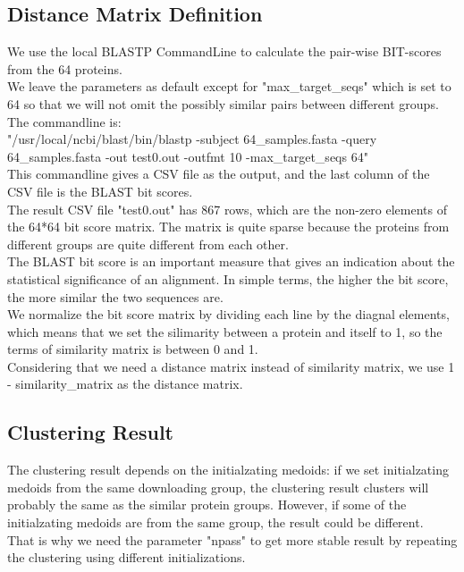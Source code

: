 \documentclass[a4paper, 12pt, one column]{article}
\begin{document}
\subsection{Distance Matrix Definition}
We use the local BLASTP CommandLine to calculate the pair-wise BIT-scores from the 64 proteins. \\
We leave the parameters as default except for "max\_target\_seqs" which is set to 64 so that we will not omit the possibly similar pairs between different groups. \\
The commandline is: \\
"/usr/local/ncbi/blast/bin/blastp -subject 64\_samples.fasta -query 64\_samples.fasta -out test0.out -outfmt 10  -max\_target\_seqs 64" \\
This commandline gives a CSV file as the output, and the last column of the CSV file is the BLAST bit scores. \\
The result CSV file "test0.out" has 867 rows, which are the non-zero elements of the 64*64 bit score matrix. The matrix is quite sparse because the proteins from different groups are quite different from each other. \\
The BLAST bit score is an important measure that gives an indication about the statistical significance of an alignment. In simple terms, the higher the bit score, the more similar the two sequences are. \\
We normalize the bit score matrix by dividing each line by the diagnal elements, which means that we set the silimarity between a protein and itself to 1, so the terms of similarity matrix is between 0 and 1. \\
Considering that we need a distance matrix instead of similarity matrix, we use 1 - similarity\_matrix as the distance matrix.

\subsection{Clustering Result}
The clustering result depends on the initialzating medoids: 
if we set initialzating medoids from the same downloading group, 
the clustering result clusters will probably the same as the similar protein groups.
However, if some of the initialzating medoids are from the same group, the result could be different. \\
That is why we need the parameter "npass" to get more stable result by repeating the clustering using different initializations.\\
\end{document}
